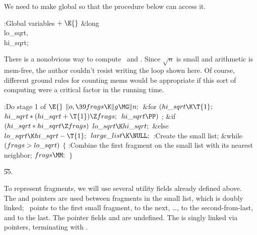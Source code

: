 We need to make  global so that the 
procedure
below can access it.

\Y\B\4:Global variables\X${}\mathrel+\E{}$\6
\&{long} \\{lo\_sqrt}${},{}$ \\{hi\_sqrt};\par
\fi

There is a nonobvious way to compute \usqrtn\ and \lsqrtn. Since
$\sqrt n$ is small and arithmetic is mem-free, the author
couldn't resist writing the  loop shown here.
Of course, different ground rules for counting mems would be
appropriate if this sort of computing were a critical factor in
the running time.

\Y\B\4:Do stage 1 of \X${}\E{}$\6
$\|o,\39\\{frags}\K\|g\MG\|n;{}$\6
\&{for} ${}(\\{hi\_sqrt}\K\T{1};{}$ ${}\\{hi\_sqrt}*(\\{hi\_sqrt}+\T{1})\Z%
\\{frags};{}$ ${}\\{hi\_sqrt}\PP){}$\1\5
;\2\6
\&{if} ${}(\\{hi\_sqrt}*\\{hi\_sqrt}\Z\\{frags}){}$\1\5
${}\\{lo\_sqrt}\K\\{hi\_sqrt};{}$\2\6
\&{else}\1\5
${}\\{lo\_sqrt}\K\\{hi\_sqrt}-\T{1};{}$\2\6
${}\\{large\_list}\K\NULL;{}$\6
:Create the small list\X;\6
\&{while} ${}(\\{frags}>\\{lo\_sqrt}){}$\5
${}\{{}$\1\6
:Combine the first fragment on the small list with its nearest neighbor\X;\6
${}\\{frags}\MM;{}$\6
\4${}\}{}$\2\par
\U55.\fi

To represent fragments, we will use several utility fields already
defined above. The  and  pointers are used between
fragments
in the small list, which is doubly linked; ~points to the first small
fragment,  to the next, \dots,  to
the second-from-last,
and  to the last. The pointer fields  and  are
undefined. The  is singly linked via 
pointers,
terminating with \PB{$\NULL$}.

